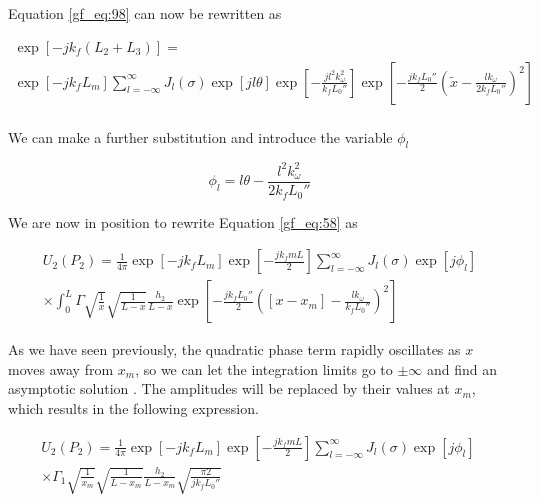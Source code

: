 \noindent Equation \ref{gf_eq:98} can now be rewritten as

\begin{equation}
\begin{gathered}
\exp\left[-jk_f\left( L_2 + L_3\right) \right]= \\
\exp\left[-jk_fL_m\right]\sum_{l=-\infty}^{\infty}J_l(\sigma)\exp\left[jl\theta\right]
\exp\left[- \frac{jl^2k_{\omega}^2}{k_fL_0''} \right]\exp\left[-\frac{jk_fL_0''}{2}\left(\tilde{x}-\frac{lk_{\omega}}{2k_fL_0''} \right)^2\right]\\
\label{gf_eq:100}
\end{gathered}
\end{equation}
\renewcommand{\baselinestretch}{2} \small\normalsize

\noindent We can make a further substitution and introduce the variable $\phi_l$

\begin{equation}
\phi_l = l\theta - \frac{l^2k_{\omega}^2}{2k_fL_0''}
\label{gf_eq:101}
\end{equation}
\renewcommand{\baselinestretch}{2} \small\normalsize

\noindent We are now in position to rewrite Equation \ref{gf_eq:58} as

\begin{equation}
\begin{gathered}
U_2(P_2) = \frac{1}{4\pi} \exp[-jk_fL_m] \exp\left[-\frac{jk_fmL}{2}\right]\sum_{l=-\infty}^{\infty}J_l(\sigma)\exp\left[j\phi_l\right] \\
\times \int_0^L  \Gamma \sqrt{\frac{1}{x}}\sqrt{\frac{1}{L-x}}\frac{h_2}{L-x}\exp\left[-\frac{jk_fL_0''}{2}\left([x-x_m]-\frac{lk_{\omega}}{k_fL_0''} \right)^2\right]
\label{gf_eq:102}
\end{gathered}
\end{equation}
\renewcommand{\baselinestretch}{2} \small\normalsize

As we have seen previously, the quadratic phase term rapidly oscillates as $x$ moves away from $x_m$, so we can let the integration limits go to $\pm \infty$ and find an asymptotic solution \cite{cheng_analytic_methods}. The amplitudes will be replaced by their values at $x_m$, which results in the following expression.

\begin{equation}
\begin{gathered}
U_2(P_2) = \frac{1}{4\pi} \exp[-jk_fL_m] \exp\left[-\frac{jk_fmL}{2}\right] \sum_{l=-\infty}^{\infty}J_l(\sigma)\exp\left[j\phi_l\right]\  \\
\times \Gamma_1 \sqrt{\frac{1}{x_m}}\sqrt{\frac{1}{L-x_m}}\frac{h_2}{L-x_m}\sqrt{\frac{\pi 2}{jk_fL_0''}}
\label{gf_eq:72}
\end{gathered}
\end{equation}
\renewcommand{\baselinestretch}{2} \small\normalsize

